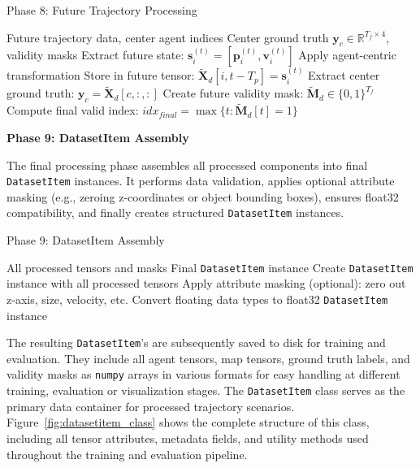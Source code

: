 \begin{algorithm}[H]
\caption{Phase 8: Future Trajectory Processing}
\label{alg:phase8_future}
\begin{algorithmic}[1]
\REQUIRE Future trajectory data, center agent indices
\ENSURE Center ground truth \(\boldsymbol{y}_c \in \mathbb{R}^{T_f \times 4}\), validity masks
\FOR{each agent \(i\), future timestep \(t \in [T_p, T_p + T_f)\)}
    \STATE Extract future state: \(\boldsymbol{s}_i^{(t)} = [\boldsymbol{p}_i^{(t)}, \boldsymbol{v}_i^{(t)}]\)
    \STATE Apply agent-centric transformation
    \STATE Store in future tensor: \(\tilde{\boldsymbol{X}}_d[i, t-T_p] = \boldsymbol{s}_i^{(t)}\)
\ENDFOR
{}
    \STATE Extract center ground truth: \(\boldsymbol{y}_c = \tilde{\boldsymbol{X}}_d[c, :, :]\)
    \STATE Create future validity mask: \(\tilde{\boldsymbol{M}}_d \in \{0,1\}^{T_f}\)
    \STATE Compute final valid index: \(idx_{final} = \max\{t : \tilde{\boldsymbol{M}}_d[t] = 1\}\)
\ENDFOR
\end{algorithmic}
\end{algorithm}

\textbf{Phase 9: DatasetItem Assembly}

The final processing phase assembles all processed components into final \texttt{DatasetItem} instances. It performs data validation, applies optional attribute masking (e.g., zeroing z-coordinates or object bounding boxes), ensures float32 compatibility, and finally creates structured \texttt{DatasetItem} instances.
\begin{algorithm}[H]
\caption{Phase 9: DatasetItem Assembly}
\label{alg:phase9_assembly}
\begin{algorithmic}[1]
\REQUIRE All processed tensors and masks
\ENSURE Final \texttt{DatasetItem} instance
\STATE Create \texttt{DatasetItem} instance with all processed tensors
\STATE Apply attribute masking (optional): zero out z-axis, size, velocity, etc.
\STATE Convert floating data types to float32
\RETURN \texttt{DatasetItem} instance
\end{algorithmic}
\end{algorithm}

The resulting \texttt{DatasetItem}'s are subsequently saved to disk for training and evaluation. They include all agent tensors, map tensors, ground truth labels, and validity masks as \texttt{numpy} arrays in various formats for easy handling at different training, evaluation or visualization stages.
The \texttt{DatasetItem} class serves as the primary data container for processed trajectory scenarios. Figure~\ref{fig:datasetitem_class} shows the complete structure of this class, including all tensor attributes, metadata fields, and utility methods used throughout the training and evaluation pipeline.

